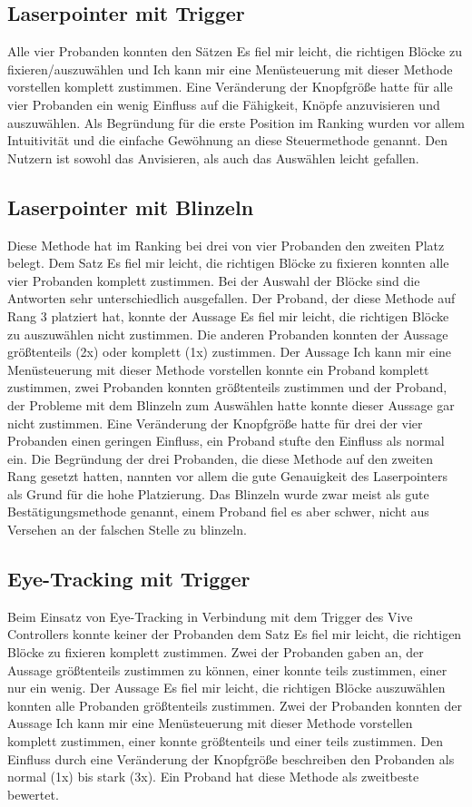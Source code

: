 \subsection{Laserpointer mit Trigger}
Alle vier Probanden konnten den Sätzen \glqq Es fiel mir leicht, die richtigen Blöcke zu fixieren/auszuwählen\grqq{} und \glqq Ich kann mir eine Menüsteuerung mit dieser Methode vorstellen\grqq{} komplett zustimmen. Eine Veränderung der Knopfgröße hatte für alle vier Probanden \glqq ein wenig\grqq{} Einfluss auf die Fähigkeit, Knöpfe anzuvisieren und auszuwählen. Als Begründung für die erste Position im Ranking wurden vor allem Intuitivität und die einfache Gewöhnung an diese Steuermethode genannt. Den Nutzern ist sowohl das Anvisieren, als auch das Auswählen leicht gefallen. 
\subsection{Laserpointer mit Blinzeln}
Diese Methode hat im Ranking bei drei von vier Probanden den zweiten Platz belegt. Dem Satz \glqq Es fiel mir leicht, die richtigen Blöcke zu fixieren\grqq{} konnten alle vier Probanden komplett zustimmen. Bei der Auswahl der Blöcke sind die Antworten sehr unterschiedlich ausgefallen. Der Proband, der diese Methode auf Rang 3 platziert hat, konnte der Aussage \glqq Es fiel mir leicht, die richtigen Blöcke zu auszuwählen\grqq{} nicht zustimmen. Die anderen Probanden konnten der Aussage größtenteils (2x) oder komplett (1x) zustimmen. Der Aussage \glqq Ich kann mir eine Menüsteuerung mit dieser Methode vorstellen\grqq{} konnte ein Proband komplett zustimmen, zwei Probanden konnten größtenteils zustimmen und der Proband, der Probleme mit dem Blinzeln zum Auswählen hatte konnte dieser Aussage gar nicht zustimmen. Eine Veränderung der Knopfgröße hatte für drei der vier Probanden einen geringen Einfluss, ein Proband stufte den Einfluss als normal ein. Die Begründung der drei Probanden, die diese Methode auf den zweiten Rang gesetzt hatten, nannten vor allem die gute Genauigkeit des Laserpointers als Grund für die hohe Platzierung. Das Blinzeln wurde zwar meist als gute Bestätigungsmethode genannt, einem Proband fiel es aber schwer, nicht aus Versehen an der falschen Stelle zu blinzeln. 
\subsection{Eye-Tracking mit Trigger}
Beim Einsatz von Eye-Tracking in Verbindung mit dem Trigger des Vive Controllers konnte keiner der Probanden dem Satz \grqq Es fiel mir leicht, die richtigen Blöcke zu fixieren\grqq{} komplett zustimmen. Zwei der Probanden gaben an, der Aussage größtenteils zustimmen zu können, einer konnte teils zustimmen, einer nur ein wenig. Der Aussage \grqq Es fiel mir leicht, die richtigen Blöcke auszuwählen\grqq{} konnten alle Probanden größtenteils zustimmen. Zwei der Probanden konnten der Aussage \grqq Ich kann mir eine Menüsteuerung mit dieser Methode vorstellen\grqq{} komplett zustimmen, einer konnte größtenteils und einer teils zustimmen. Den Einfluss durch eine Veränderung der Knopfgröße beschreiben den Probanden als normal (1x) bis stark (3x). Ein Proband hat diese Methode als zweitbeste bewertet.
